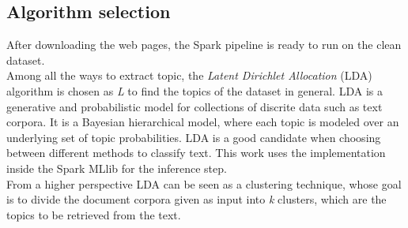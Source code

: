 \documentclass{sig-alternate-05-2015}
\begin{document}
\subsection{Algorithm selection}\label{algorithmSelection}
After downloading the web pages, the Spark pipeline is ready to run on the clean dataset.\\
Among all the ways to extract topic, the \emph{Latent Dirichlet Allocation}\cite{lda} (LDA) algorithm is chosen as \emph{L} to find the topics of the dataset in general. LDA is a generative and probabilistic model for collections of discrite data such as text corpora. It is a Bayesian hierarchical model, where each topic is modeled over an underlying set of topic probabilities. LDA is a good candidate when choosing between different methods to classify text. This work uses the implementation inside the Spark MLlib for the inference step.\\
From a higher perspective LDA can be seen as a clustering technique, whose goal is to divide the document corpora given as input into \emph{k} clusters, which are the topics to be retrieved from the text.
\end{document}

